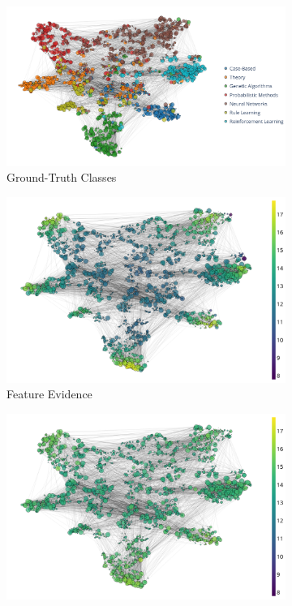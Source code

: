 \begin{figure}[!h]
    \centering
	\begin{subfigure}[t]{\textwidth}
	    \centering
		\includegraphics[height=0.25\textheight]{resources/clean-classes.png}
		\caption{Ground-Truth Classes} 
		\label{subfig:latent-clean-classes}
	\end{subfigure}
	\begin{subfigure}[t]{\textwidth}
	    \centering
		\includegraphics[height=0.25\textheight]{resources/clean-ft-evidence.png}
		\caption{Feature Evidence} 
		\label{subfig:latent-clean-feature-evidence}
	\end{subfigure}
	\begin{subfigure}[t]{\textwidth}
	    \centering
		\includegraphics[height=0.25\textheight]{resources/clean-evidence.png}

\end{subfigure}
\end{figure}
